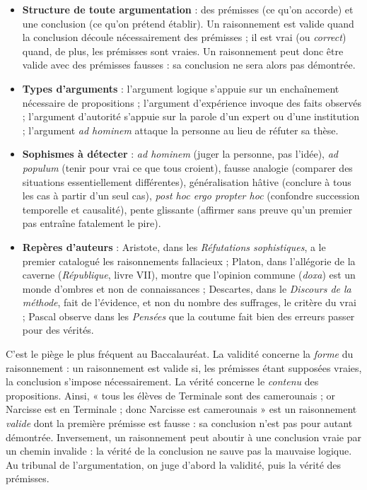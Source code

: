\documentclass[11pt]{article}
\newcommand{\cle}[1]{{\popxbold\color{popdark}#1}}
\begin{document}
\begin{aretenir}
\begin{itemize}
\item \textbf{Structure de toute argumentation} : des \cle{prémisses} (ce qu'on accorde) et une \cle{conclusion} (ce qu'on prétend établir). Un raisonnement est \cle{valide} quand la conclusion découle nécessairement des prémisses ; il est \cle{vrai} (ou \emph{correct}) quand, de plus, les prémisses sont vraies. Un raisonnement peut donc être valide avec des prémisses fausses : sa conclusion ne sera alors pas démontrée.
\item \textbf{Types d'arguments} : l'\cle{argument logique} s'appuie sur un enchaînement nécessaire de propositions ; l'\cle{argument d'expérience} invoque des faits observés ; l'\cle{argument d'autorité} s'appuie sur la parole d'un expert ou d'une institution ; l'argument \emph{\cle{ad hominem}} attaque la personne au lieu de réfuter sa thèse.
\item \textbf{Sophismes à détecter} : \emph{ad hominem} (juger la personne, pas l'idée), \emph{ad populum} (tenir pour vrai ce que tous croient), fausse analogie (comparer des situations essentiellement différentes), généralisation hâtive (conclure à tous les cas à partir d'un seul cas), \emph{post hoc ergo propter hoc} (confondre succession temporelle et causalité), pente glissante (affirmer sans preuve qu'un premier pas entraîne fatalement le pire).
\item \textbf{Repères d'auteurs} : Aristote, dans les \emph{Réfutations sophistiques}, a le premier catalogué les raisonnements fallacieux ; Platon, dans l'allégorie de la caverne (\emph{République}, livre VII), montre que l'opinion commune (\emph{doxa}) est un monde d'ombres et non de connaissances ; Descartes, dans le \emph{Discours de la méthode}, fait de l'évidence, et non du nombre des suffrages, le critère du vrai ; Pascal observe dans les \emph{Pensées} que la coutume fait bien des erreurs passer pour des vérités.
\end{itemize}
\end{aretenir}

\begin{attention}
C'est le piège le plus fréquent au Baccalauréat. La \cle{validité} concerne la \emph{forme} du raisonnement : un raisonnement est valide si, les prémisses étant supposées vraies, la conclusion s'impose nécessairement. La \cle{vérité} concerne le \emph{contenu} des propositions. Ainsi, « tous les élèves de Terminale sont des camerounais ; or Narcisse est en Terminale ; donc Narcisse est camerounais » est un raisonnement \emph{valide} dont la première prémisse est fausse : sa conclusion n'est pas pour autant démontrée. Inversement, un raisonnement peut aboutir à une conclusion vraie par un chemin invalide : la vérité de la conclusion ne sauve pas la mauvaise logique. Au tribunal de l'argumentation, on juge d'abord la validité, puis la vérité des prémisses.
\end{attention}
\end{document}
